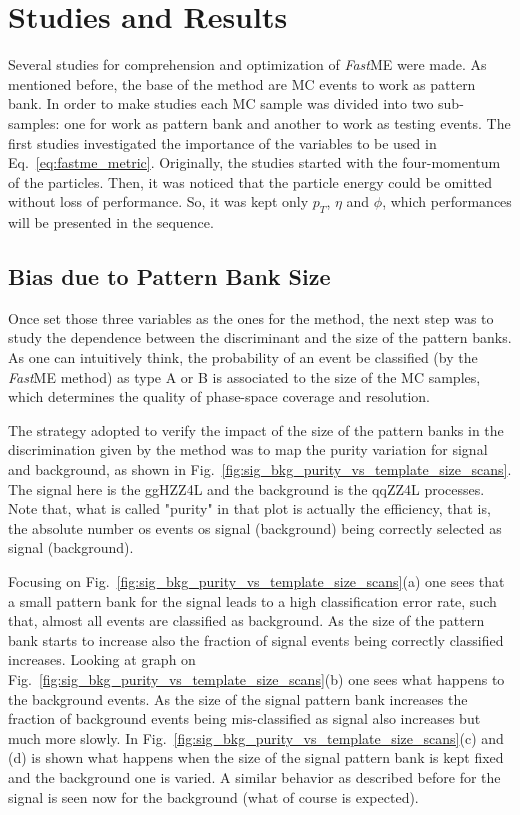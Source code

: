 \section{Studies and Results}
Several studies for comprehension and optimization of \textit{Fast}ME were made. As mentioned before, the base of the method are MC events to work as pattern bank. In order to make studies each MC sample was divided into two sub-samples: one for work as pattern bank and another to work as testing events. The first studies investigated the importance of the variables to be used in Eq.~\ref{eq:fastme_metric}. Originally, the studies started with the four-momentum of the particles. Then, it was noticed that the particle energy could be omitted without loss of performance. So, it was kept only $p_{T}$, $\eta$ and $\phi$, which performances will be presented in the sequence.

\subsection{Bias due to Pattern Bank Size}
Once set those three variables as the ones for the method, the next step was to study the dependence between the discriminant and the size of the pattern banks. As one can intuitively think, the probability of an event be classified (by the \textit{Fast}ME method) as type A or B is associated to the size of the MC samples, which determines the quality of phase-space coverage and resolution.

The strategy adopted to verify the impact of the size of the pattern banks in the discrimination given by the method was to map the purity variation for signal and background, as shown in Fig.~\ref{fig:sig_bkg_purity_vs_template_size_scans}. The signal here is the ggHZZ4L and the background is the qqZZ4L processes. Note that, what is called "purity" in that plot is actually the efficiency, that is, the absolute number os events os signal (background) being correctly selected as signal (background). 

Focusing on Fig.~\ref{fig:sig_bkg_purity_vs_template_size_scans}(a) one sees that a small pattern bank for the signal leads to a high classification error rate, such that, almost all events are classified as background. As the size of the pattern bank starts to increase also the fraction of signal events being correctly classified increases. Looking at graph on Fig.~\ref{fig:sig_bkg_purity_vs_template_size_scans}(b) one sees what happens to the background events. As the size of the signal pattern bank increases the fraction of background events being mis-classified as signal also increases but much more slowly. In Fig.~\ref{fig:sig_bkg_purity_vs_template_size_scans}(c) and (d) is shown what happens when the size of the signal pattern bank is kept fixed and the background one is varied. A similar behavior as described before for the signal is seen now for the background (what of course is expected).

